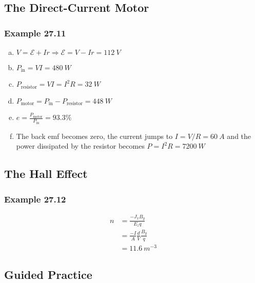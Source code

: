 \documentclass{article}
\begin{document}
\subsection{The Direct-Current Motor}

\subsubsection{Example 27.11}

\begin{enumerate}[(a)]
  \item $V = \mathcal{E} + I r \Rightarrow \mathcal{E} = V - I r = \qty{112}{V}$

  \item $P_\textrm{in} = V I = \qty{480}{W}$

  \item $P_\textrm{resistor} = V I = I^2 R = \qty{32}{W}$

  \item $P_\textrm{motor} = P_\textrm{in} - P_\textrm{resistor} = \qty{448}{W}$

  \item $e = \frac{P_\textrm{motor}}{P_\textrm{in}} = 93.3\%$

  \item The back emf becomes zero, the current jumps to $I = V / R = \qty{60}{A}$ and the power dissipated by the resistor becomes $P = I^2 R = \qty{7200}{W}$
\end{enumerate}

\subsection{The Hall Effect}

\subsubsection{Example 27.12}

\begin{align*}
  n & = \frac{-J_x B_y}{E_z q}                 \\
    & = \frac{-I}{A} \frac{d}{V} \frac{B_y}{q} \\
    & = \qty{11.6}{m^{-3}}
\end{align*}

\subsection{Guided Practice}
\end{document}
